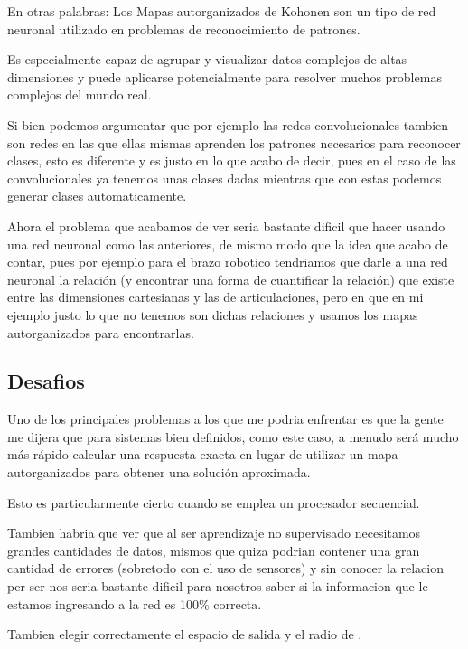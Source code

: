 \documentclass[fleqn, journal, onecolumn]{IEEEtran}             %
\newcommand \Quote              {\qq}                           %
\theoremstyle{break}                                            %
\begin{document}
      En otras palabras: Los Mapas autorganizados de Kohonen son un
      tipo de red neuronal utilizado en problemas de reconocimiento de patrones.

      Es especialmente capaz de agrupar y visualizar datos complejos de altas dimensiones y
      puede aplicarse potencialmente para resolver muchos problemas complejos del mundo real.

      Si bien podemos argumentar que por ejemplo las redes convolucionales tambien son
      redes en las que ellas mismas aprenden los patrones necesarios para reconocer clases,
      esto es diferente y es justo en lo que acabo de decir, pues en el caso de las convolucionales
      ya tenemos unas clases dadas mientras que con estas podemos generar clases automaticamente.

      Ahora el problema que acabamos de ver seria bastante dificil que hacer usando una red
      neuronal como las anteriores, de mismo modo que la idea que acabo de contar, pues por ejemplo
      para el brazo robotico tendriamos que darle a una red neuronal la relación (y encontrar
      una forma de cuantificar la relación) que existe entre las dimensiones cartesianas y las 
      de articulaciones, pero en que en mi ejemplo justo lo que no tenemos son dichas relaciones
      y usamos los mapas autorganizados para encontrarlas.

    \subsection{Desafios}

      Uno de los principales problemas a los que me podria enfrentar es que la gente me dijera
      que para sistemas bien definidos, como este caso,  a menudo será mucho más rápido calcular
      una respuesta exacta en lugar de utilizar un mapa autorganizados para obtener una 
      solución aproximada. 
      
      Esto es particularmente cierto cuando se emplea un procesador secuencial.

      Tambien habria que ver que al ser aprendizaje no supervisado necesitamos grandes cantidades de 
      datos, mismos que quiza podrian contener una gran cantidad de errores (sobretodo con el uso de
      sensores) y sin conocer la relacion per ser nos seria bastante dificil para nosotros saber si 
      la informacion que le estamos ingresando a la red es 100\% correcta.

      Tambien elegir correctamente el espacio de salida y el radio de \Quote{vecindad}.
\end{document}

